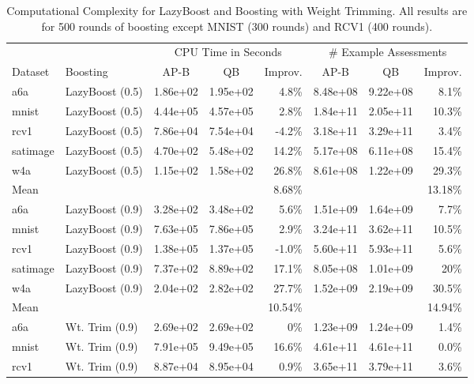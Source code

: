 \begin{table*}[ht]
\caption{Computational Complexity for LazyBoost and Boosting with Weight Trimming.
All results are for 500 rounds of boosting except MNIST (300 rounds) and RCV1 (400 rounds).}
\label{complexity-approx-results}	
\vskip 0.15in
\begin{center}
\begin{small}
\begin{sc}
\begin{tabular}{llccrccr}
\toprule
& & \multicolumn{3}{c}{CPU Time in Seconds} & \multicolumn{3}{c}{\# Example Assessments} \\
Dataset & Boosting & AP-B & QB & Improv. & AP-B & QB & Improv. \\
\midrule
a6a & LazyBoost (0.5) & 1.86e+02 & 1.95e+02 & 4.8\% & 8.48e+08 & 9.22e+08 & 8.1\%  \\
mnist & LazyBoost (0.5) & 4.44e+05 & 4.57e+05 & 2.8\% & 1.84e+11 & 2.05e+11 & 10.3\% \\
rcv1 & LazyBoost (0.5) & 7.86e+04 & 7.54e+04 & -4.2\% & 3.18e+11 & 3.29e+11 & 3.4\% \\
satimage & LazyBoost (0.5) & 4.70e+02 & 5.48e+02 & 14.2\%  & 5.17e+08 & 6.11e+08 & 15.4\%  \\
w4a & LazyBoost (0.5) & 1.15e+02 & 1.58e+02 & 26.8\% & 8.61e+08 & 1.22e+09 & 29.3\% \\
\midrule
Mean &  & &  & 8.68\% & & & 13.18\% \\
\midrule
a6a & LazyBoost (0.9) & 3.28e+02 & 3.48e+02 & 5.6\%  & 1.51e+09 & 1.64e+09 & 7.7\%  \\
mnist & LazyBoost (0.9) & 7.63e+05 & 7.86e+05 & 2.9\% & 3.24e+11 & 3.62e+11 & 10.5\% \\
rcv1 & LazyBoost (0.9) & 1.38e+05 & 1.37e+05 & -1.0\% & 5.60e+11 & 5.93e+11 & 5.6\% \\
satimage & LazyBoost (0.9) & 7.37e+02 & 8.89e+02 & 17.1\%  & 8.05e+08 & 1.01e+09 & 20\%  \\
w4a & LazyBoost (0.9) & 2.04e+02 & 2.82e+02 & 27.7\% & 1.52e+09 & 2.19e+09 & 30.5\% \\
\midrule
Mean &  & &  & 10.54\% & & & 14.94\% \\
\midrule
a6a & Wt. Trim (0.9) & 2.69e+02 & 2.69e+02 & 0\%  & 1.23e+09 & 1.24e+09 & 1.4\%  \\
mnist & Wt. Trim (0.9) & 7.91e+05 & 9.49e+05 & 16.6\% & 4.61e+11 & 4.61e+11 & 0.0\% \\
rcv1 & Wt. Trim (0.9) & 8.87e+04 & 8.95e+04 & 0.9\%  & 3.65e+11 & 3.79e+11 & 3.6\% \\

\end{tabular}
\end{sc}
\end{small}
\end{center}
\end{table*}
